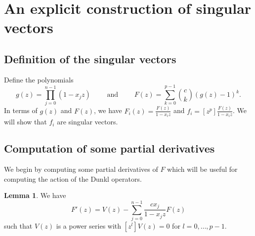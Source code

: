 \documentclass{amsart}
\numberwithin{equation}{section}
\theoremstyle{definition}
\newtheorem{lemma}[theorem]{Lemma}
\begin{document}

\section{An explicit construction of singular vectors}

\subsection{Definition of the singular vectors}

Define the polynomials 
\[
g(z)=\prod_{j=0}^{n-1} (1-x_jz) \qquad \text{ and } \qquad F(z) = \sum_{k=0}^{p-1} \binom{c}{k} (g(z)-1)^k.
\]
In terms of $g(z)$ and $F(z)$, we have $F_i(z) = \frac{F(z)}{1-x_iz}$ and $f_i = [z^p] \frac{F(z)}{1-x_iz}$.  We will show that $f_i$ are singular vectors.

\subsection{Computation of some partial derivatives}

We begin by computing some partial derivatives of $F$ which will be useful for computing the action of the Dunkl operators.

\begin{lemma}\label{lem:dFdz}
We have
\[
F'(z) = V(z) - \sum_{j=0}^{n-1} \frac{cx_j}{1-x_jz} F(z)
\]
such that $V(z)$ is a power series with $[z^l]V(z)=0$ for $l=0,\dots,p-1$. 
\end{lemma}
\end{document}
